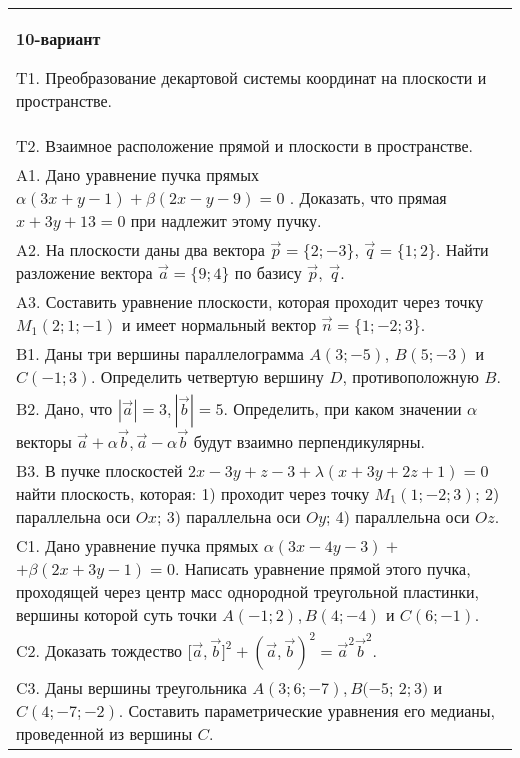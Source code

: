 \documentclass{article}
\begin{document}
\begin{tabular}{m{17cm}}
\textbf{10-вариант}
\newline

T1. 
Преобразование декартовой системы координат на плоскости и пространстве. \\
T2. 
Взаимное расположение прямой и плоскости в пространстве.
 \\
A1. 
Дано уравнение пучка прямых \(\alpha(3x + y - 1) + \beta(2x - y - 9) = 0\) . Доказать, что прямая \(x + 3y + 13 = 0\) при надлежит этому пучку.
 \\
A2. 
На плоскости даны два вектора \(\overrightarrow{p} = \{ 2; - 3\}\), \(\overrightarrow{q} = \{ 1;2\}\). Найти разложение вектора \(\overrightarrow{a} = \{ 9;4\}\) по базису \(\overrightarrow{p},\ \overrightarrow{q}\).
 \\
A3. Составить уравнение плоскости, которая проходит через точку \(M_{1}(2;1; - 1)\) и имеет нормальный вектор \(\overrightarrow{n} = \{ 1; - 2;3\}\).
 \\
B1. Даны три вершины параллелограмма \(A(3; - 5)\), \(B(5; - 3)\) и \(C( - 1;3)\). Определить четвертую вершину \(D\), противоположную \(B\).
 \\
B2. 
Дано, что \(|\overrightarrow{a}| = 3,|\overrightarrow{b}| = 5\). Определить, при каком значении \(\alpha\) векторы \(\overrightarrow{a} + \alpha\overrightarrow{b},\overrightarrow{a} - \alpha\overrightarrow{b}\) будут взаимно перпендикулярны.
 \\
B3. 
В пучке плоскостей \(2x - 3y + z - 3 + \lambda(x + 3y + 2z + 1) = 0\) найти плоскость, которая: 1) проходит через точку \(M_{1}(1; - 2;3)\); 2) параллельна оси \(Ox\); 3) параллельна оси \(Oy\); 4) параллельна оси \(Oz\).
 \\
C1. 
Дано уравнение пучка прямых \(\alpha(3x - 4y - 3) +\) \(+ \beta(2x + 3y - 1) = 0\). Написать уравнение прямой этого пучка, проходящей через центр масс однородной треугольной пластинки, вершины которой суть точки \(A( - 1;2),B(4; - 4)\) и \(C(6; - 1)\).
 \\
C2. 
Доказать тождество \(\lbrack\overrightarrow{a},\overrightarrow{b}\rbrack^{2} + (\overrightarrow{a},\overrightarrow{b})^{2} = {\overrightarrow{a}}^{2}{\overrightarrow{b}}^{2}\).
 \\
C3. 
Даны вершины треугольника \(A(3;6; - 7),B( - 5\); \(2;3)\) и \(C(4; - 7; - 2)\). Составить параметрические уравнения его медианы, проведенной из вершины \(C\).
 \\

\end{tabular}
\vspace{1cm}
\end{document}
